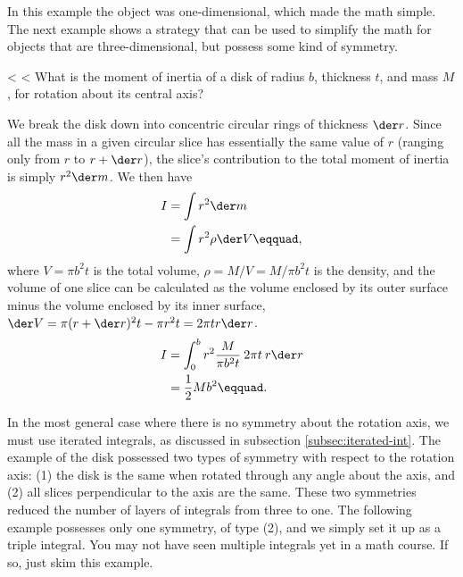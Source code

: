 In this example the object was one-dimensional, which made
the math simple. The next example shows a strategy that can
be used to simplify the math for objects that are
three-dimensional, but possess some kind of symmetry.

<%
<%
What is the moment of inertia of a disk of radius
$b$, thickness $t$, and mass $M$, for rotation about its central
axis?

We break the disk down into concentric circular
rings  of thickness $\der r$. Since all the mass in a given
circular slice has essentially the same value of $r$ (ranging
only from $r$ to $r+\der r$), the slice's contribution to the total
moment of inertia is simply $r^2\der m$. We then have
\begin{align*}
        I        &= \int r^2 \der m \\
                &= \int r^2 \rho\der V\eqquad,
\end{align*}
where $V=\pi b^2 t$ is the total volume, $\rho=M/V=M/\pi b^2 t$ is the
density, and the volume of one
slice can be calculated as the volume enclosed by its outer
surface minus the volume enclosed by its inner surface,
$\der V= \pi (r+\der r)^2 t - \pi r^2 t = 2\pi tr \der r$.
\begin{align*}
        I        &=  \int_0^b r^2 \frac{M}{\pi b^2 t}\:2\pi t\:r\der r\\
                &=  \frac{1}{2}Mb^2\eqquad.
\end{align*}

In the most general case where there is no symmetry about
the rotation axis, we must use iterated integrals, as discussed
in subsection \ref{subsec:iterated-int}. The
example of the disk possessed two types of symmetry with
respect to the rotation axis: (1) the disk is the same when
rotated through any angle about the axis, and (2) all slices
perpendicular to the axis are the same. These two symmetries
reduced the number of layers of integrals from three to one.
The following example possesses only one symmetry, of type
(2), and we simply set it up as a triple integral. You may not
have seen multiple integrals yet in a math course. If so, just
skim this example.


